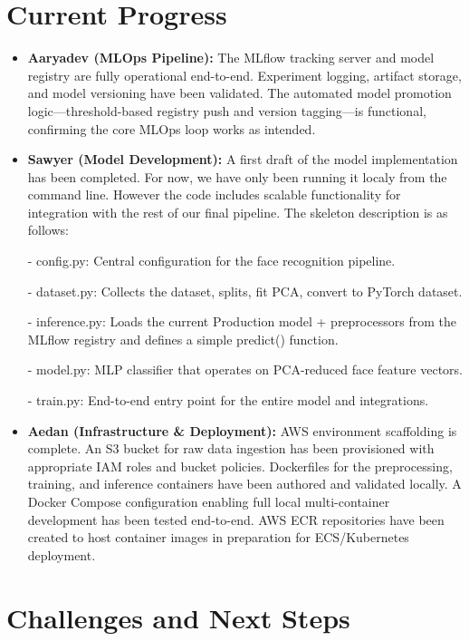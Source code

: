 \documentclass[10pt]{article}
\begin{document}
\section*{Current Progress}

\begin{itemize}[leftmargin=*]

\item \textbf{Aaryadev (MLOps Pipeline):} The MLflow tracking server and model registry are fully operational end-to-end. Experiment logging, artifact storage, and model versioning have been validated. The automated model promotion logic---threshold-based registry push and version tagging---is functional, confirming the core MLOps loop works as intended.

\item \textbf{Sawyer (Model Development):} A first draft of the model implementation has been completed. For now,  we have only been running it localy from the command line. However the code includes scalable functionality for integration with the rest of our final pipeline. The skeleton description is as follows:

    - config.py: Central configuration for the face recognition pipeline.

    - dataset.py: Collects the dataset, splits, fit PCA, convert to PyTorch dataset.

    - inference.py: Loads the current Production model + preprocessors from the MLflow registry and defines a simple predict() function.

    - model.py: MLP classifier that operates on PCA-reduced face feature vectors.

    -  train.py: End-to-end entry point for the entire model and integrations.

\item \textbf{Aedan (Infrastructure \& Deployment):} AWS environment scaffolding is complete. An S3 bucket for raw data ingestion has been provisioned with appropriate IAM roles and bucket policies. Dockerfiles for the preprocessing, training, and inference containers have been authored and validated locally. A Docker Compose configuration enabling full local multi-container development has been tested end-to-end. AWS ECR repositories have been created to host container images in preparation for ECS/Kubernetes deployment.

\end{itemize}

\section*{Challenges and Next Steps}
\end{document}
